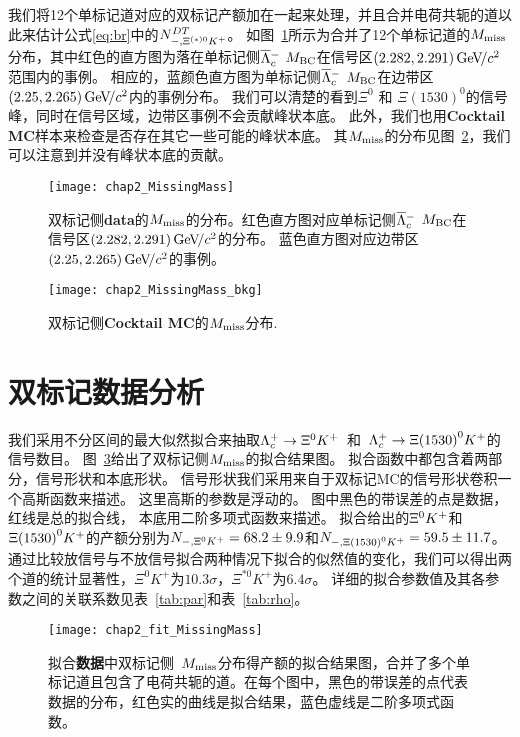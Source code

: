 我们将12个单标记道对应的双标记产额加在一起来处理，并且合并电荷共轭的道以此来估计公式\ref{eq:br}中的$N_{-,\Xi^{(*)0}K^{+}}^{DT}$。
如图~\ref{fig:DT_data}所示为合并了12个单标记道的$M_{\rm miss}$分布，其中红色的直方图为落在单标记侧$\overline{\Lambda}{}_{c}^{-}$ $M_{\rm BC}$在信号区$(2.282, 2.291){\mathrm{\,Ge\kern -0.1em V\!/}c^2}$范围内的事例。
相应的，蓝颜色直方图为单标记侧$\overline{\Lambda}{}_{c}^{-}$ $M_{\rm BC}$在边带区$(2.25, 2.265){\mathrm{\,Ge\kern -0.1em V\!/}c^2}$内的事例分布。
我们可以清楚的看到$\Xi^{0}$ 和 $\Xi{(1530)}^{0}$的信号峰，同时在信号区域，边带区事例不会贡献峰状本底。
此外，我们也用\textbf{Cocktail MC}样本来检查是否存在其它一些可能的峰状本底。
其$M_{\rm miss}$的分布见图~\ref{fig:DT_mc}，我们可以注意到并没有峰状本底的贡献。

\begin{figure*}[hp]
\centering
\texttt{[image: chap2\_MissingMass]}
\caption{双标记侧\textbf{data}的$M_{\rm miss}$的分布。红色直方图对应单标记侧$\overline{\Lambda}{}_{c}^{-}$ $M_{\rm BC}$在信号区$(2.282, 2.291){\mathrm{\,Ge\kern -0.1em V\!/}c^2}$的分布。 蓝色直方图对应边带区$(2.25, 2.265){\mathrm{\,Ge\kern -0.1em V\!/}c^2}$的事例。}
\label{fig:DT_data}


\end{figure*}
\begin{figure*}[hp]
\centering
\texttt{[image: chap2\_MissingMass\_bkg]}
\caption{双标记侧\textbf{Cocktail MC}的$M_{\rm miss}$分布.}
\label{fig:DT_mc}
\end{figure*}

\section{双标记数据分析}

我们采用不分区间的最大似然拟合来抽取$\Lambda_{c}^{+}\rightarrow \Xi^{0}K^{+}$~和~$\Lambda_{c}^{+}\rightarrow \Xi{(1530)}^{0}K^{+}$的信号数目。
图~\ref{fig:DT_datafit}给出了双标记侧$M_{\rm miss}$的拟合结果图。
拟合函数中都包含着两部分，信号形状和本底形状。
信号形状我们采用来自于双标记MC的信号形状卷积一个高斯函数来描述。
这里高斯的参数是浮动的。
图中黑色的带误差的点是数据，红线是总的拟合线，
本底用二阶多项式函数来描述。
拟合给出的$\Xi^{0}K^{+}$和$\Xi{(1530)}^{0}K^{+}$的产额分别为$N_{-,\Xi^{0}K^{+}}=68.2\pm9.9$和$N_{-,\Xi{(1530)}^{0}K^{+}}=59.5\pm11.7$。
通过比较放信号与不放信号拟合两种情况下拟合的似然值的变化，我们可以得出两个道的统计显著性，$\Xi^0K^+$为$10.3\sigma$，$\Xi^{*0}K^+$为$6.4\sigma$。
详细的拟合参数值及其各参数之间的关联系数见表~\ref{tab:par}和表~\ref{tab:rho}。

\begin{figure*}[]
\centering
\texttt{[image: chap2\_fit\_MissingMass]}
\caption{拟合\textbf{数据}中双标记侧~$M_{\rm miss}$分布得产额的拟合结果图，合并了多个单标记道且包含了电荷共轭的道。在每个图中，黑色的带误差的点代表数据的分布，红色实的曲线是拟合结果，蓝色虚线是二阶多项式函数。}
\label{fig:DT_datafit}
\end{figure*}

